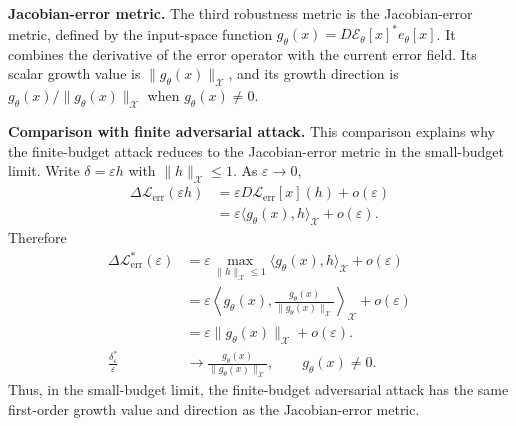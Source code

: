 \documentclass[letterpaper]{article} %
\begin{document}
\smallskip
\noindent\textbf{Jacobian-error metric.}
The third robustness metric is the Jacobian-error metric, defined by the
input-space function
$g_\theta(x)=D\mathcal{E}_\theta[x]^*e_\theta[x]$. It combines the derivative
of the error operator with the current error field. Its scalar growth value is
$\|g_\theta(x)\|_{\mathcal{X}}$, and its growth direction is
$g_\theta(x)/\|g_\theta(x)\|_{\mathcal{X}}$ when $g_\theta(x)\neq0$.

\smallskip
\noindent\textbf{Comparison with finite adversarial attack.}
This comparison explains why the finite-budget attack reduces to the
Jacobian-error metric in the small-budget limit. Write
$\delta=\varepsilon h$ with $\|h\|_{\mathcal{X}}\le 1$. As
$\varepsilon\to0$,
\begin{align}
  \Delta\mathcal{L}_{\mathrm{err}}(\varepsilon h)
  &=
  \varepsilon D\mathcal{L}_{\mathrm{err}}[x](h)+o(\varepsilon)
  \nonumber\\
  &=
  \varepsilon\langle g_\theta(x),h\rangle_{\mathcal{X}}+o(\varepsilon).
\end{align}
Therefore
\begin{align}
  \Delta\mathcal{L}_{\mathrm{err}}^*(\varepsilon)
  &=
  \varepsilon
  \max_{\|h\|_{\mathcal{X}}\le 1}
  \langle g_\theta(x),h\rangle_{\mathcal{X}}
  +o(\varepsilon)
  \nonumber\\
  &=
  \varepsilon
  \left\langle
  g_\theta(x),
  \frac{g_\theta(x)}{\|g_\theta(x)\|_{\mathcal{X}}}
  \right\rangle_{\mathcal{X}}
  +o(\varepsilon)
  \nonumber\\
  &=
  \varepsilon\|g_\theta(x)\|_{\mathcal{X}}+o(\varepsilon).
  \nonumber\\
  \frac{\delta_\varepsilon^*}{\varepsilon}
  &\to
  \frac{g_\theta(x)}{\|g_\theta(x)\|_{\mathcal{X}}},
  \qquad g_\theta(x)\neq0 .
\end{align}
Thus, in the small-budget limit, the finite-budget adversarial attack has the
same first-order growth value and direction as the Jacobian-error metric.
\end{document}
